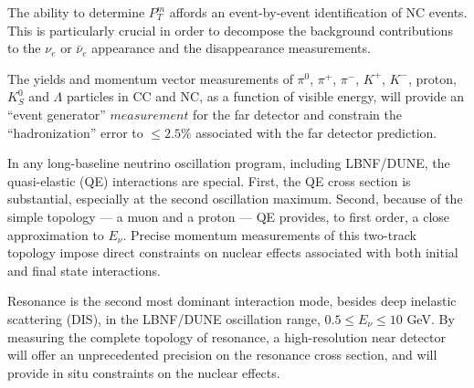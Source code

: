 The ability to determine {\bf{$P^m_T$}} affords an event-by-event 
identification of NC events. This is particularly crucial in order to decompose the background contributions to 
the $\nu_e$ or $\bar \nu_e$ appearance and the disappearance measurements. 


The yields and momentum vector measurements of %
$\pi^0$, $\pi^+$, $\pi^-$, $K^+$, $K^-$, proton, $K^0_S$ and $\Lambda$
particles in CC and NC, as a function of visible energy, will provide
an ``event generator'' $measurement$ for the far detector and
constrain the ``hadronization'' error to $\leq 2.5\%$ associated with
the far detector prediction.



In any long-baseline neutrino oscillation program, including
LBNF/DUNE, the quasi-elastic (QE) interactions are special. First, the
QE cross section is substantial, especially at the second oscillation
maximum.  Second, because of the simple topology --- a muon and a
proton --- QE provides, to first order, a close approximation to
$E_\nu$.  Precise momentum measurements of this two-track topology
impose direct constraints on nuclear effects associated with both
initial and final state interactions.

Resonance is the second most dominant interaction mode, besides deep
inelastic scattering (DIS), in the LBNF/DUNE oscillation range, $0.5
\leq E_\nu \leq 10$ GeV.
By measuring the complete topology of resonance, a high-resolution
near detector will offer an unprecedented precision on the resonance
cross section, and will provide in situ constraints on the nuclear
effects.


